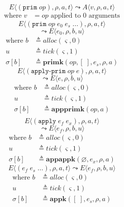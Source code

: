 \documentclass[12pt,draft]{article}
\newcommand{\primsyn}[2]{(\texttt{prim}\;#1\;#2\;...)}
\newcommand{\singleprimsyn}[1]{(\texttt{prim}\;#1)}
\newcommand{\applyprimsyn}[2]{(\texttt{apply-prim}\;#1\;#2)}
\newcommand{\applysyn}[2]{(\texttt{apply}\;#1\;#2)}
\begin{document}
\begin{multicols*}{2}
\vspace{-5mm}
\[
E\langle
\singleprimsyn{op} , \rho , a , t
\rangle
\leadsto
A\langle
v , \rho , a , t
\rangle
\]
\vspace{-13mm}
\begin{align*}
\text{where } v &= op \text{ applied to } 0 \text{ arguments}
\end{align*}
\vspace{-5mm}
\[
E\langle
\primsyn{op}{e_0\;e_s} , \rho , a , t
\rangle
\]
\vspace{-7mm}
\[
\leadsto
E\langle
e_0 , \rho , b , u
\rangle
\]
\vspace{-10mm}
\begin{align*}
\text{where } b &\triangleq alloc(\varsigma, 0) \\
u &\triangleq tick(\varsigma, 1) \\
\sigma[b] &\triangleq \textbf{primk}(op, [\;], e_s, \rho, a)
\end{align*}
\vspace{-5mm}
\[
E\langle
\applyprimsyn{op}{e} , \rho , a , t
\rangle
\]
\vspace{-7mm}
\[
\leadsto
E\langle
e , \rho , b , u
\rangle
\]
\vspace{-12mm}
\begin{align*}
\text{where } b &\triangleq alloc(\varsigma, 0) \\
u &\triangleq tick(\varsigma, 1) \\
\sigma[b] &\triangleq \textbf{appprimk}(op, a) \\
\end{align*}
\vspace{-12mm}
\[
E\langle
\applysyn{e_f}{e_x} , \rho , a , t
\rangle
\]
\vspace{-8mm}
\[
\leadsto
E\langle
e_f , \rho , b , u
\rangle
\]
\vspace{-11mm}
\begin{align*}
\text{where } b &\triangleq alloc(\varsigma, 0) \\
u &\triangleq tick(\varsigma, 1) \\
\sigma[b] &\triangleq \textbf{appappk}(\varnothing , e_x , \rho, a)
\end{align*}
\vspace{-5mm}
\[
E\langle
(e_f\;e_s\;...) , \rho , a , t
\rangle
\leadsto
E\langle
e_f , \rho , b , u
\rangle
\]
\vspace{-11mm}
\begin{align*}
\text{where } b &\triangleq alloc(\varsigma, 0) \\
u &\triangleq tick(\varsigma, 1) \\
\sigma[b] &\triangleq \textbf{appk}([\;],  e_s , \rho, a)
\end{align*}
\end{multicols*}
\end{document}
